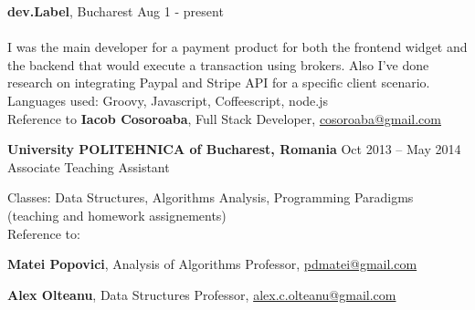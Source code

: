 \documentclass[margin,line]{resume}
\begin{document}
\begin{resume}
    \vspace{1.2mm}\textbf{dev.Label}, Bucharest
    	\hfill Aug 1 - present\vspace{1mm}\\
    \selectfont{Frontend \& Backend Developer}\vspace{1.2mm}\\
    {\fontsize{2.65mm}{1em}\selectfont
      I was the main developer for a payment product for both the frontend widget and the backend that would execute a transaction using brokers. Also I've done research on integrating Paypal and Stripe API for a specific client scenario.\\
      Languages used: Groovy, Javascript, Coffeescript, node.js\\
      Reference to \textbf{Iacob Cosoroaba}, Full Stack Developer, \href{mailto:cosoroaba@gmail.com}{cosoroaba@gmail.com}
     }

	\vspace{1.2mm}\textbf{University POLITEHNICA of Bucharest, Romania}
		\hfill Oct 2013 -- May 2014\vspace{1mm}\\
		Associate Teaching Assistant\vspace{1.2mm}\\
    {\fontsize{2.65mm}{1em}\selectfont
      Classes: Data Structures, Algorithms Analysis, Programming Paradigms (teaching and homework assignements)\\
      Reference to:
      \begin{list2}
          \item \textbf{Matei Popovici}, Analysis of Algorithms Professor, \href{mailto:pdmatei@gmail.com}{pdmatei@gmail.com}
          \item \textbf{Alex Olteanu}, Data Structures Professor, \href{mailto:alex.c.olteanu@gmail.com}{alex.c.olteanu@gmail.com}
      \end{list2}
    }


\end{resume}
\end{document}
